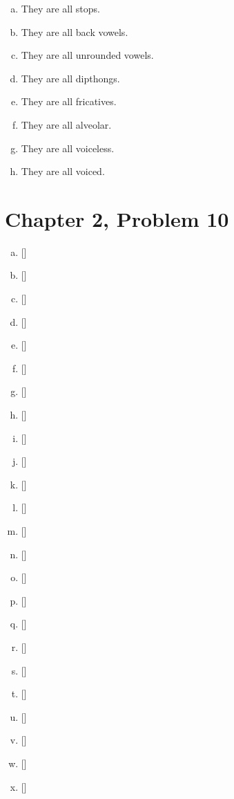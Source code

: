 \documentclass[12pt]{article}
\begin{document}
\begin{multicols}{2}
    \begin{enumerate}[a)]
        \item They are all stops.
        \item They are all back vowels.
        \item They are all unrounded vowels.
        \item They are all dipthongs.
        \item They are all fricatives.
        \item They are all alveolar.
        \item They are all voiceless.
        \item They are all voiced.
    \end{enumerate}
\end{multicols}

\section*{Chapter 2, Problem 10}

\begin{multicols}{3}
    \begin{enumerate}[a)]
        \item {[]}
        \item {[]}
        \item {[]}
        \item {[]}
        \item {[]}
        \item {[]}
        \item {[]}
        \item {[]}
        \item {[]}
        \item {[]}
        \item {[]}
        \item {[]}
        \item {[]}
        \item {[]}
        \item {[]}
        \item {[]}
        \item {[]}
        \item {[]}
        \item {[]}
        \item {[]}
        \item {[]}
        \item {[]}
        \item {[]}
        \item {[]}
    \end{enumerate}
\end{multicols}
\end{document}
